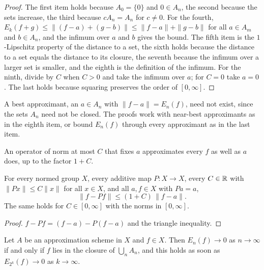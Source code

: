 \begin{proof}
\leanok
The first item holds because $A_0 = \{0\}$ and $0 \in A_n$, the second because the sets
increase, the third because $c A_n = A_n$ for $c \neq 0$. For the fourth,
$E_k(f + g) \leq \|(f - a) + (g - b)\| \leq \|f - a\| + \|g - b\|$ for all $a \in A_m$ and
$b \in A_n$, and the infimum over $a$ and $b$ gives the bound. The fifth item is the
$1$-Lipschitz property of the distance to a set, the sixth holds because the distance to a set
equals the distance to its closure, the seventh because the infimum over a larger set is
smaller, and the eighth is the definition of the infimum. For the ninth, divide by $C$ when
$C > 0$ and take the infimum over $a$; for $C = 0$ take $a = 0$. The last holds because
squaring preserves the order of $[0, \infty]$.
\end{proof}

A best approximant, an $a \in A_n$ with $\|f - a\| = E_n(f)$, need not exist, since the sets
$A_n$ need not be closed. The proofs work with near-best approximants as in the eighth item, or
bound $E_n(f)$ through every approximant as in the last item.

An operator of norm at most $C$ that fixes $a$ approximates every $f$ as well as $a$ does, up to
the factor $1 + C$.

\begin{lemma}
\label{lem:lebesgue-one-operator}
\leanok
For every normed group $X$, every additive map $P \colon X \to X$, every $C \in \mathbb{R}$ with
$\|P x\| \leq C \|x\|$ for all $x \in X$, and all $a, f \in X$ with $P a = a$,
\[
  \|f - P f\| \leq (1 + C) \, \|f - a\| .
\]
The same holds for $C \in [0, \infty]$ with the norms in $[0, \infty]$.
\end{lemma}

\begin{proof}
\leanok
$f - P f = (f - a) - P(f - a)$ and the triangle inequality.
\end{proof}

\begin{lemma}
\label{lem:error-tendsto}
\leanok
{}
Let $A$ be an approximation scheme in $X$ and $f \in X$. Then $E_n(f) \to 0$ as
$n \to \infty$ if and only if $f$ lies in the closure of $\bigcup_n A_n$, and this holds as
soon as $E_{2^k}(f) \to 0$ as $k \to \infty$.
\end{lemma}

